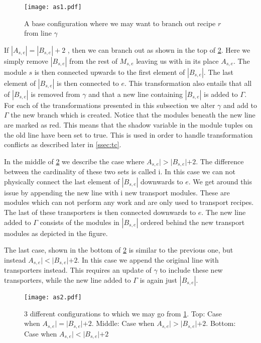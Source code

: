 \begin{figure}[h]
\centering
\texttt{[image: as1.pdf]}
\caption{A base configuration where we may want to branch out recipe $r$ from line $\gamma$}
\label{fig:asbase}
\end{figure}

If $|A_{s,e}| = |B_{s,e}| + 2$ , then we can branch out as shown in the top of \cref{fig:astrans}. Here we simply remove $|B_{s,e}|$ from the rest of $M_{s,e}$ leaving us with in its place $A_{s,e}$. The module $s$ is then connected upwards to the first element of $|B_{s,e}|$. The last element of $|B_{s,e}|$ is then connected to $e$. This transformation also entails that all of  $|B_{s,e}|$ is removed from $\gamma$ and that a new line containing $|B_{s,e}|$ is added to $\Gamma$. For each of the transformations presented in this subsection we alter $\gamma$ and add to $\Gamma$ the new branch which is created.  Notice that the modules beneath the new line are marked as red. This means that the shadow variable in the module tuples on the old line have been set to true. This is used in order to handle transformation conflicts as described later in \cref{ssec:tc}.

In the middle of \cref{fig:astrans} we describe the case where $A_{s,e}| > |B_{s,e}| + 2$. The difference between the cardinality of these two sets is called i.  In this case we can not physically connect the last element of $|B_{s,e}|$ downwards to $e$. We get around this issue by appending the new line with i new transport modules. These are modules which can not perform any work and are only used to transport recipes. The last of these transporters is then connected downwards to $e$. The new line added to $\Gamma$ consists of the modules in $|B_{s,e}|$ ordered behind the new transport modules as depicted in the figure. 

The last case, shown in the bottom of \cref{fig:astrans} is similar to the previous one, but instead $A_{s,e}| < |B_{s,e}| + 2$. In this case we append the original line with transporters instead. This requires an update of $\gamma$ to include these new transporters, while the new line added to $\Gamma$ is again just $|B_{s,e}|$. 

\begin{figure}[h]
\centering
\texttt{[image: as2.pdf]}
\caption{3 different configurations to which we may go from \cref{fig:asbase}. Top: Case when $A_{s,e}| = |B_{s,e}| + 2$. Middle: Case when $A_{s,e}| > |B_{s,e}| + 2$. Bottom: Case when $A_{s,e}| < |B_{s,e}| + 2$ }
\label{fig:astrans}
\end{figure}

